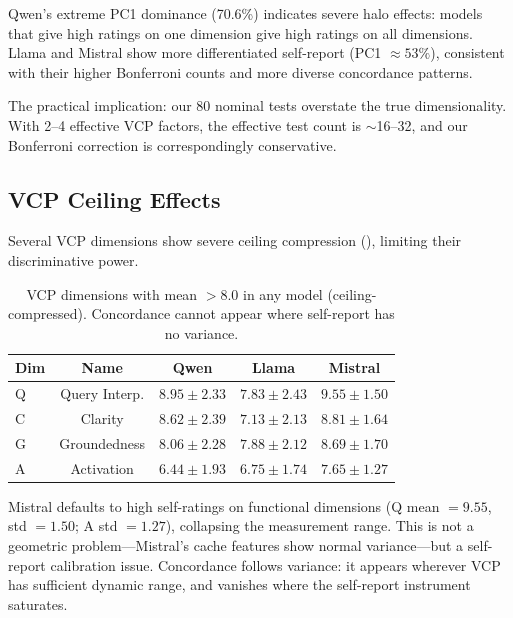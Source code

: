 \documentclass[11pt,a4paper]{article}
\begin{document}
Qwen's extreme PC1 dominance (70.6\%) indicates severe halo effects: models that give high ratings on one dimension give high ratings on all dimensions. Llama and Mistral show more differentiated self-report (PC1 $\approx 53\%$), consistent with their higher Bonferroni counts and more diverse concordance patterns.

The practical implication: our 80 nominal tests overstate the true dimensionality. With 2--4 effective VCP factors, the effective test count is $\sim$16--32, and our Bonferroni correction is correspondingly conservative.

\subsection{VCP Ceiling Effects}

Several VCP dimensions show severe ceiling compression (), limiting their discriminative power.

\begin{table}[H]
\centering
\caption{VCP dimensions with mean $> 8.0$ in any model (ceiling-compressed). Concordance cannot appear where self-report has no variance.}
\label{tab:ceiling}
\begin{tabular}{lcccc}
\toprule
\textbf{Dim} & \textbf{Name} & \textbf{Qwen} & \textbf{Llama} & \textbf{Mistral} \\
\midrule
Q & Query Interp. & $8.95 \pm 2.33$ & $7.83 \pm 2.43$ & $\mathbf{9.55 \pm 1.50}$ \\
C & Clarity       & $8.62 \pm 2.39$ & $7.13 \pm 2.13$ & $8.81 \pm 1.64$ \\
G & Groundedness  & $8.06 \pm 2.28$ & $7.88 \pm 2.12$ & $\mathbf{8.69 \pm 1.70}$ \\
A & Activation    & $6.44 \pm 1.93$ & $6.75 \pm 1.74$ & $\mathbf{7.65 \pm 1.27}$ \\
\bottomrule
\end{tabular}
\end{table}

Mistral defaults to high self-ratings on functional dimensions (Q mean $= 9.55$, std $= 1.50$; A std $= 1.27$), collapsing the measurement range. This is not a geometric problem---Mistral's cache features show normal variance---but a self-report calibration issue. Concordance follows variance: it appears wherever VCP has sufficient dynamic range, and vanishes where the self-report instrument saturates.

\end{document}
